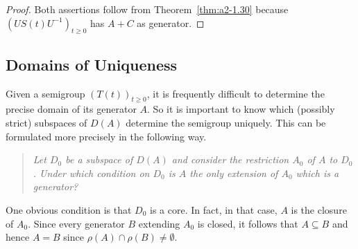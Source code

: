 \begin{proof}
Both assertions follow from Theorem~\ref{thm:a2-1.30}  because $(US(t)U^{-1})_{t\geq 0}$ has $A+C$ as generator.
\end{proof}
\subsection{Domains of Uniqueness} \label{subsec:a2-1.se9}%
Given a semigroup $(T(t))_{t \geq 0}$,  
it is frequently difficult to determine the precise domain of its generator $A$.
So it is important to know which (possibly strict) subspaces of\/ $D(A)$ determine the semigroup uniquely.
This can be formulated more precisely in the following way.
\begin{quote}
\textit{Let $D_{0}$ be a subspace of\/ $D(A)$ and consider the restriction $A_{0}$ of\/ $A$ to $D_{0}$.
Under which condition on $D_{0}$ is $A$ the only extension of\/ $A_{0}$ which is a generator?}
\end{quote}
One obvious condition is that $D_{0}$ is a core.
In fact, in that case, $A$ is the closure of\/ $A_{0}$.
Since every generator $B$ extending $A_{0}$ is closed, it follows that $A \subseteq B$ and hence $A = B$ since 
$\rho(A) \cap \rho(B) \neq \emptyset$.


